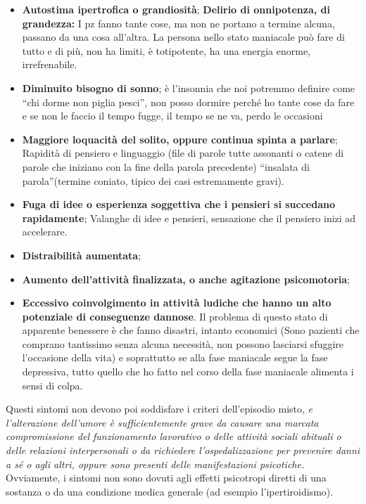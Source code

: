 \documentclass[]{article}
\begin{document}
\begin{itemize}
\item
  \textbf{Autostima ipertrofica o grandiosità}; \textbf{Delirio di
  onnipotenza, di grandezza:} I pz fanno tante cose, ma non ne portano a
  termine alcuna, passano da una cosa all'altra. La persona nello stato
  maniacale può fare di tutto e di più, non ha limiti, è totipotente, ha
  una energia enorme, irrefrenabile.
\item
  \textbf{Diminuito bisogno di sonno}; è l'insonnia che noi potremmo
  definire come ``chi dorme non piglia pesci'', non posso dormire perché
  ho tante cose da fare e se non le faccio il tempo fugge, il tempo se
  ne va, perdo le occasioni
\item
  \textbf{Maggiore loquacità del solito, oppure continua spinta a
  parlare}; Rapidità di pensiero e linguaggio (file di parole tutte
  assonanti o catene di parole che iniziano con la fine della parola
  precedente) ``insalata di parola''(termine coniato, tipico dei casi
  estremamente gravi).
\item
  \textbf{Fuga di idee o esperienza soggettiva che i pensieri si
  succedano rapidamente}; Valanghe di idee e pensieri, sensazione che il
  pensiero inizi ad accelerare.
\item
  \textbf{Distraibilità aumentata};
\item
  \textbf{Aumento dell'attività finalizzata, o anche agitazione
  psicomotoria};
\item
  \textbf{Eccessivo coinvolgimento in attività ludiche che hanno un alto
  potenziale di conseguenze dannose}. Il problema di questo stato di
  apparente benessere è che fanno disastri, intanto economici (Sono
  pazienti che comprano tantissimo senza alcuna necessità, non possono
  lasciarsi sfuggire l'occasione della vita) e soprattutto se alla fase
  maniacale segue la fase depressiva, tutto quello che ho fatto nel
  corso della fase maniacale alimenta i sensi di colpa.
\end{itemize}

Questi sintomi non devono poi soddisfare i criteri dell'episodio misto,
\emph{e l'alterazione dell'umore è sufficientemente grave da causare una
marcata compromissione del funzionamento lavorativo o delle attività
sociali abituali o delle relazioni interpersonali o da richiedere
l'ospedalizzazione per prevenire danni a sé o agli altri, oppure sono
presenti delle manifestazioni psicotiche.} Ovviamente, i sintomi non
sono dovuti agli effetti psicotropi diretti di una sostanza o da una
condizione medica generale (ad esempio l'ipertiroidismo).
\end{document}
